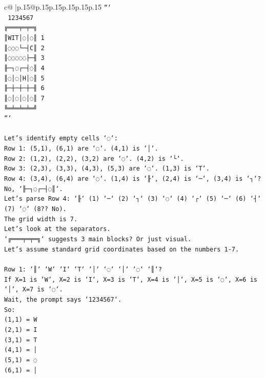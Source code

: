 \documentclass{article}
\begin{document}
{\begin{supertabular}{c@{$\;$}|p{.15\linewidth}@{}p{.15\linewidth}p{.15\linewidth}p{.15\linewidth}p{.15\linewidth}p{.15\linewidth}}
{{{\texttt{```} \\
\texttt{ 1234567} \\
\texttt{╔═══╤═╤═╗} \\
\texttt{║WIT│◌│◌║ 1} \\
\texttt{║◌◌◌└─┤C║ 2} \\
\texttt{║◌◌◌◌◌├─╢ 3} \\
\texttt{╟─┐◌┌─┤◌║ 4} \\
\texttt{║◌│◌│H│◌║ 5} \\
\texttt{╟─┼─┼─┼─╢ 6} \\
\texttt{║◌│◌│◌│◌║ 7} \\
\texttt{╚═╧═╧═╧═╝} \\
\texttt{```} \\
\\ 
\texttt{Let's identify empty cells `◌`:} \\
\texttt{Row 1: (5,1), (6,1) are `◌`. (4,1) is `│`.} \\
\texttt{Row 2: (1,2), (2,2), (3,2) are `◌`. (4,2) is `└`.} \\
\texttt{Row 3: (2,3), (3,3), (4,3), (5,3) are `◌`. (1,3) is `T`.} \\
\texttt{Row 4: (3,4), (6,4) are `◌`. (1,4) is `╟`, (2,4) is `─`, (3,4) is `┐`? No, `╟─┐◌┌─┤◌║`.} \\
\texttt{Let's parse Row 4: `╟` (1) `─` (2) `┐` (3) `◌` (4) `┌` (5) `─` (6) `┤` (7) `◌` (8?? No).} \\
\texttt{The grid width is 7.} \\
\texttt{Let's look at the separators.} \\
\texttt{`╔═══╤═╤═╗` suggests 3 main blocks? Or just visual.} \\
\texttt{Let's assume standard grid coordinates based on the numbers 1{-}7.} \\
\\ 
\texttt{Row 1: `║` `W` `I` `T` `│` `◌` `│` `◌` `║`?} \\
\texttt{If X=1 is `W`, X=2 is `I`, X=3 is `T`, X=4 is `│`, X=5 is `◌`, X=6 is `│`, X=7 is `◌`.} \\
\texttt{Wait, the prompt says `1234567`.} \\
\texttt{So:} \\
\texttt{(1,1) = W} \\
\texttt{(2,1) = I} \\
\texttt{(3,1) = T} \\
\texttt{(4,1) = │} \\
\texttt{(5,1) = ◌} \\
\texttt{(6,1) = │} \\
}}}
\end{supertabular}}
\end{document}
